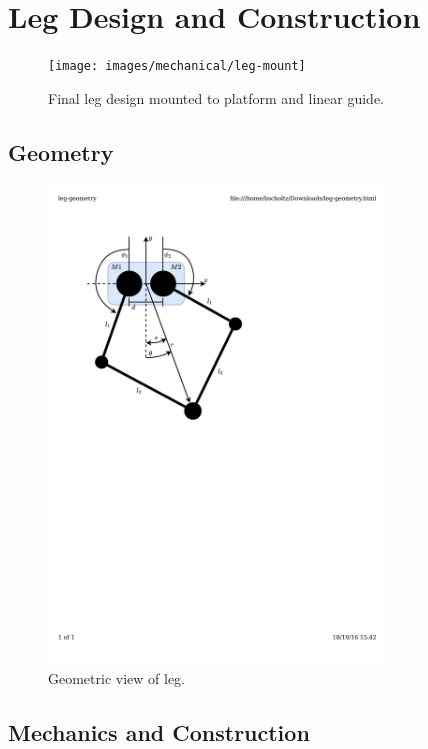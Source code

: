 \chapter{Leg Design and Construction}

\begin{figure}[H]
\centering
\texttt{[image: images/mechanical/leg-mount]} 
\caption{Final leg design mounted to platform and linear guide.}
\label{fig:Final leg design}
\end{figure}

\section{Geometry}

\begin{figure}[H]
\centering
\includegraphics[clip, trim=2cm 15cm 7cm 2cm, page = 1, width=0.8\textwidth]{images/geometry/leg-geometry} 
\caption{Geometric view of leg.}
\label{fig:Geometric view of leg}
\end{figure}

\section{Mechanics and Construction}

